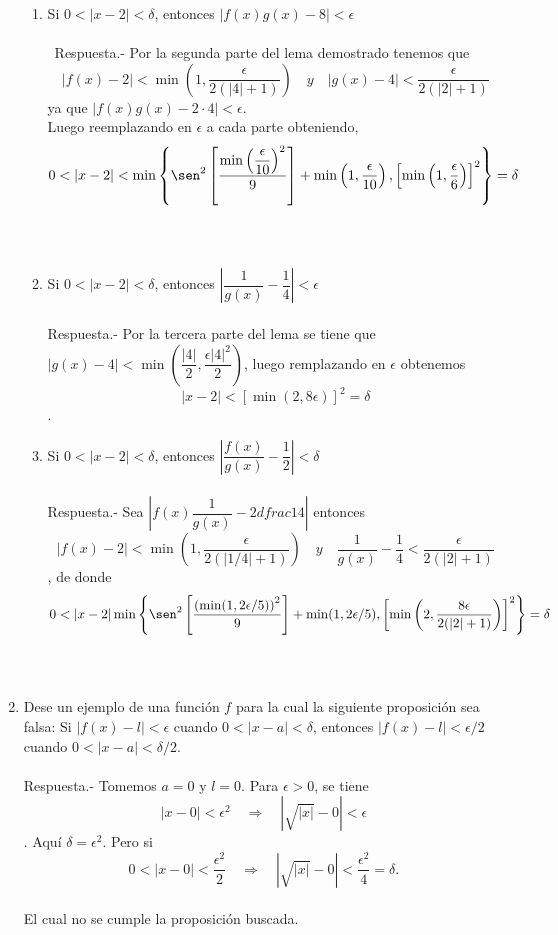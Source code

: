 \begin{enumerate}
\begin{enumerate}[\bfseries (i)]
    \item Si $0<|x-2|<\delta$, entonces $|f(x)g(x) - 8|<\epsilon$\\\\\
	Respuesta.-\; Por la segunda parte del lema demostrado tenemos que $$|f(x)-2|<\min\left(1,\dfrac{\epsilon}{2(|4|+1)}\right) \quad y \quad |g(x)-4|<\dfrac{\epsilon}{2(|2|+1)}$$ ya que $|f(x)g(x)-2\cdot 4|<\epsilon$.\\ 
	Luego reemplazando en $\epsilon$ a cada parte obteniendo, 
	$$0<|x-2|<\min\left\{\sen^2 \left[\dfrac{\min\left(\dfrac{\epsilon}{10}\right)^2}{9}\right] + \min\left(1,\dfrac{\epsilon}{10}\right),\left[\min\left(1,\dfrac{\epsilon}{6}\right)\right]^2\right\}=\delta$$\\\\

    \item Si $0<|x-2|<\delta$, entonces $\left|\dfrac{1}{g(x)}-\dfrac{1}{4}\right|<\epsilon$\\\\
	Respuesta.-\; Por la tercera parte del lema se tiene que $|g(x) - 4|<\min\left(\dfrac{|4|}{2},\dfrac{\epsilon|4|^2}{2}\right)$, luego remplazando en $\epsilon$ obtenemos $$|x-2|<\left[\min\left(2,8\epsilon \right)\right]^2 = \delta$$.\\

    \item Si $0<|x-2|<\delta$, entonces $\left|\dfrac{f(x)}{g(x)}-\dfrac{1}{2}\right|<\delta$\\\\
	Respuesta.-\; Sea $\left|f(x)\dfrac{1}{g(x)}-2dfrac{1}{4}\right|$ entonces $$|f(x)-2|<\min\left(1,\dfrac{\epsilon}{2(|1/4|+1)}\right) \quad y \quad \dfrac{1}{g(x)} - \dfrac{1}{4}<\dfrac{\epsilon}{2(|2|+1)}$$, de donde $$0<|x-2|\min\left\{\sen^2\left[\dfrac{\left(\min(1,2\epsilon/5)\right)^2}{9}\right] + \min(1,2\epsilon/5),\left[\min\left(2,\dfrac{8\epsilon}{2(|2|+1)}\right)\right]^2\right\}=\delta$$\\\\ 

\end{enumerate}

\item Dese un ejemplo de una función $f$ para la cual la siguiente proposición sea falsa: Si $|f(x)-l|<\epsilon$ cuando $0<|x-a|<\delta$, entonces $|f(x)-l|<\epsilon/2$ cuando $0<|x-a|<\delta/2$.\\\\
    Respuesta.-\; Tomemos $a=0$ y $l=0$. Para $\epsilon>0$, se tiene $$|x-0|<\epsilon^2 \quad \Longrightarrow \quad |\sqrt{|x|}-0|<\epsilon$$. Aquí $\delta=\epsilon^2$. Pero si $$0<|x-0|<\dfrac{\epsilon^2}{2} \quad \Longrightarrow \quad |\sqrt{|x|}-0|< \dfrac{\epsilon^2}{4}=\delta.$$\\ El cual no se cumple la proposición buscada.\\\\


\end{enumerate}
